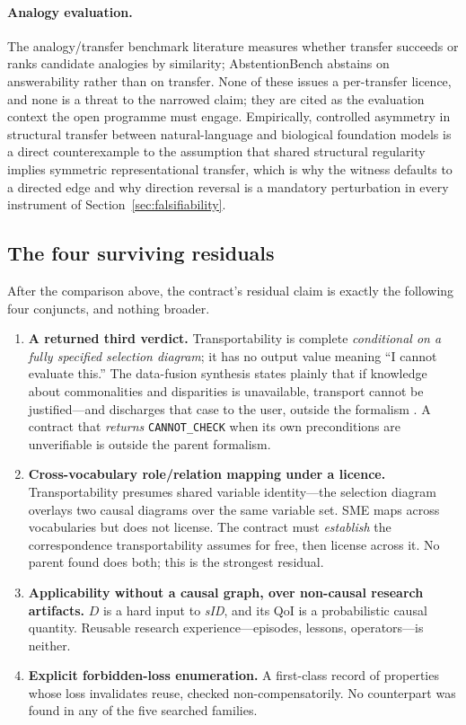 \paragraph{Analogy evaluation.} The analogy/transfer benchmark literature \cite{sourati2024arn,stevenson2026children,li2026retre,petersen2026modelling,das2025relational,liu2026crossdomain,chen2026analogical} measures whether transfer succeeds or ranks candidate analogies by similarity; AbstentionBench \cite{kirichenko2025abstentionbench} abstains on answerability rather than on transfer. None of these issues a per-transfer licence, and none is a threat to the narrowed claim; they are cited as the evaluation context the open programme must engage. Empirically, controlled asymmetry in structural transfer between natural-language and biological foundation models \cite{wang2026asymmetry} is a direct counterexample to the assumption that shared structural regularity implies symmetric representational transfer, which is why the witness defaults to a directed edge and why direction reversal is a mandatory perturbation in every instrument of Section~\ref{sec:falsifiability}.

\subsection{The four surviving residuals}
\label{sec:surviving}

After the comparison above, the contract's residual claim is exactly the following four conjuncts, and nothing broader.

\begin{enumerate}[leftmargin=*]
\item \textbf{A returned third verdict.} Transportability is complete \emph{conditional on a fully specified selection diagram}; it has no output value meaning ``I cannot evaluate this.'' The data-fusion synthesis states plainly that if knowledge about commonalities and disparities is unavailable, transport cannot be justified---and discharges that case to the user, outside the formalism \cite{bareinboim2016fusion}. A contract that \emph{returns} \texttt{CANNOT\_CHECK} when its own preconditions are unverifiable is outside the parent formalism.
\item \textbf{Cross-vocabulary role/relation mapping under a licence.} Transportability presumes shared variable identity---the selection diagram overlays two causal diagrams over the same variable set. SME maps across vocabularies but does not license. The contract must \emph{establish} the correspondence transportability assumes for free, then license across it. No parent found does both; this is the strongest residual.
\item \textbf{Applicability without a causal graph, over non-causal research artifacts.} $D$ is a hard input to \textit{sID}, and its QoI is a probabilistic causal quantity. Reusable research experience---episodes, lessons, operators---is neither.
\item \textbf{Explicit forbidden-loss enumeration.} A first-class record of properties whose loss invalidates reuse, checked non-compensatorily. No counterpart was found in any of the five searched families.
\end{enumerate}

